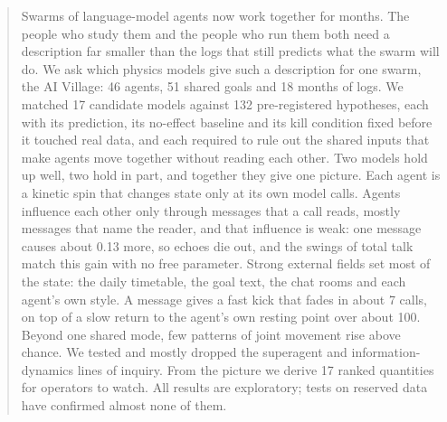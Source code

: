 \begin{abstract}
Swarms of language-model agents now work together for months. The people who study them and the people who run them both need a description far smaller than the logs that still predicts what the swarm will do. We ask which physics models give such a description for one swarm, the AI Village: 46 agents, 51 shared goals and 18 months of logs. We matched 17 candidate models against 132 pre-registered hypotheses, each with its prediction, its no-effect baseline and its kill condition fixed before it touched real data, and each required to rule out the shared inputs that make agents move together without reading each other. Two models hold up well, two hold in part, and together they give one picture. Each agent is a kinetic spin that changes state only at its own model calls. Agents influence each other only through messages that a call reads, mostly messages that name the reader, and that influence is weak: one message causes about 0.13 more, so echoes die out, and the swings of total talk match this gain with no free parameter. Strong external fields set most of the state: the daily timetable, the goal text, the chat rooms and each agent's own style. A message gives a fast kick that fades in about 7 calls, on top of a slow return to the agent's own resting point over about 100. Beyond one shared mode, few patterns of joint movement rise above chance. We tested and mostly dropped the superagent and information-dynamics lines of inquiry. From the picture we derive 17 ranked quantities for operators to watch. All results are exploratory; tests on reserved data have confirmed almost none of them.
\end{abstract}
